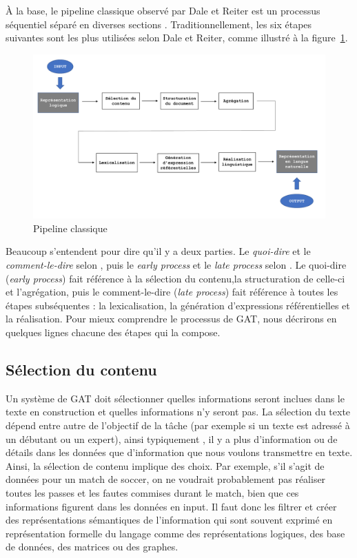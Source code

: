 À la base, le pipeline classique observé par Dale et Reiter est un processus séquentiel séparé en diverses sections \citep{ReiterBuildingNaturalLanguage2000}. Traditionnellement, les six étapes suivantes sont les plus utilisées selon Dale et Reiter, comme illustré à la figure~\ref{fig:Pipeline}.
\begin{figure}[htb] %
	\centering
	\includegraphics[width=1\textwidth, trim = {0cm 0cm 0cm 0cm},clip]{ch2/figs/pipeline.pdf}
	\caption{Pipeline classique}
	\label{fig:Pipeline}
\end{figure}

Beaucoup s'entendent pour dire qu'il y a deux parties. Le \emph{quoi-dire} et le \emph{comment-le-dire} selon \citep{DanlosPresentationmodelegeneration1983}, puis le \emph{early process} et le \emph{late process}  selon \citep{gatt18}. Le quoi-dire (\emph{early process}) fait référence à la sélection du contenu,la structuration de celle-ci et l'agrégation, puis le comment-le-dire (\emph{late process}) fait référence à toutes les étapes subséquentes : la lexicalisation, la génération d'expressions référentielles et la réalisation. Pour mieux comprendre le processus de \ac{GAT}, nous décrirons en quelques lignes chacune des étapes qui la compose.

\subsection{Sélection du contenu}

Un système de \ac{GAT} doit sélectionner quelles informations seront inclues dans le texte en construction et quelles informations n'y seront pas. La sélection du texte dépend entre autre de l'objectif de la tâche (par exemple si un texte est adressé à un débutant ou un expert), ainsi typiquement , il y a plus d'information ou de détails dans les données que d'information que nous voulons transmettre en texte. Ainsi, la sélection de contenu implique des choix. Par exemple, s'il s'agit de données pour un match de soccer, on ne voudrait probablement pas réaliser toutes les passes et les fautes commises durant le match, bien que ces informations figurent dans les données en input. Il faut donc les filtrer et créer des représentations sémantiques de l'information qui sont souvent exprimé en représentation formelle du langage comme des représentations logiques, des base de données, des matrices ou des graphes.

